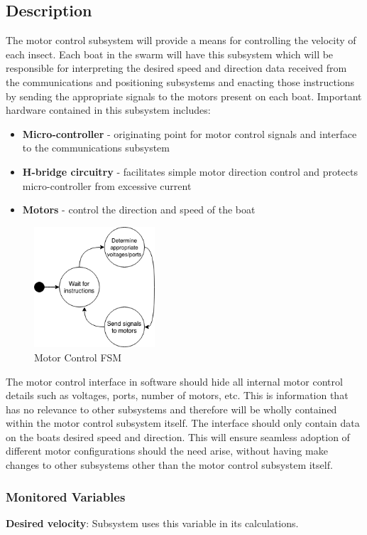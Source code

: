 \documentclass[11pt]{article}
\begin{document}
\subsection{Description}
The motor control subsystem will provide a means for controlling the velocity of each insect. Each boat in the swarm will have this subsystem which will be responsible for interpreting the desired speed and direction data received from the communications and positioning subsystems and enacting those instructions by sending the appropriate signals to the motors present on each boat. Important hardware contained in this subsystem includes:
\begin{itemize}
\item \textbf{Micro-controller} - originating point for motor control signals and interface to the communications subsystem
\item \textbf{H-bridge circuitry} - facilitates simple motor direction control and protects micro-controller from excessive current
\item \textbf{Motors} - control the direction and speed of the boat
\end{itemize}
\begin{figure}[H]
   \centering
   \includegraphics[width=0.4\textwidth]{img/motor_ctrl_fsm.png}
   \caption{Motor Control FSM}
   \label{fig:fsm}
\end{figure}
The motor control interface in software should hide all internal motor control details such as voltages, ports, number of motors, etc. This is information that has no relevance to other subsystems and therefore will be wholly contained within the motor control subsystem itself. The interface should only contain data on the boats desired speed and direction. This will ensure seamless adoption of different motor configurations should the need arise, without having make changes to other subsystems other than the motor control subsystem itself.

\subsubsection{Monitored Variables}
\textbf{Desired velocity}: Subsystem uses this variable in its calculations.
\end{document}
